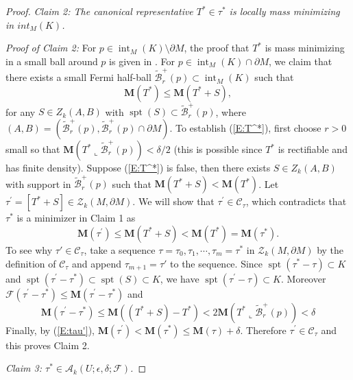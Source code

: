 \documentclass[10pt]{amsart}
\theoremstyle{definition}
\theoremstyle{remark}
\numberwithin{equation}{section}
\newcommand{\F}{\mathcal{F}}
\newcommand{\C}{\mathcal{C}}
\newcommand{\lc}{\llcorner}
\newcommand{\de}{\delta}
\newcommand{\ep}{\epsilon}
\newcommand{\pr}{\prime}
\newcommand{\Z}{\mathcal{Z}}
\newcommand{\M}{\mathbf{M}}
\newcommand{\sA}{\mathscr{A}}
\newcommand{\tBcal}{\widetilde{\mathcal{B}}}
\newcommand{\spt}{\operatorname{spt}}
\newcommand{\interior}{\operatorname{int}}
\begin{document}
\begin{proof}
\vspace{0.3cm}
\textit{Claim 2: The canonical representative $T^* \in \tau^*$ is locally mass minimizing in $int_M(K)$.}
\vspace{0.3cm}

\textit{Proof of Claim 2:} For $p \in \interior_M(K) \setminus \partial M$, the proof that $T^*$ is mass minimizing in a small ball around $p$ is given in \cite[3.10]{Pitts}. For $p \in \interior_M(K) \cap \partial M$, we claim that there exists a small Fermi half-ball $\tBcal^+_r(p) \subset \interior_M(K)$ such that
\begin{equation}
\label{E:T^*}
\M(T^*)\leq \M(T^*+S),
\end{equation}
for any $S\in Z_k(A, B)$ with $\spt(S)\subset \tBcal^+_r(p)$, where $(A,B)=(\tBcal^+_r(p),\tBcal^+_r(p) \cap \partial M)$. To establish (\ref{E:T^*}), first choose $r>0$ small so that $\M(T^* \lc \tBcal^+_r(p)) < \de/2$ (this is possible since $T^*$ is rectifiable and has finite density). Suppose (\ref{E:T^*}) is false, then there exists $S \in Z_k(A, B)$ with support in $\tBcal^+_r(p)$ such that $\M(T^*+S)<\M(T^*)$. Let $\tau^{\pr}=[T^*+S] \in\Z_k(M, \partial M)$. We will show that $\tau^{\pr}\in\C_{\tau}$, which contradicts that $\tau^*$ is a minimizer in Claim 1 as 
\begin{equation}
\label{E:tau'}
\M(\tau^{\pr})\leq\M(T^*+S)<\M(T^*)=\M(\tau^*). 
\end{equation}
To see why $\tau' \in \C_\tau$, take a sequence $\tau=\tau_0, \tau_1, \cdots, \tau_m=\tau^*$ in $\Z_k(M, \partial M)$ by the definition of $\C_{\tau}$ and append $\tau_{m+1}=\tau'$ to the sequence. Since $\spt(\tau^*-\tau) \subset K$ and $\spt(\tau^{\pr}-\tau^*) \subset \spt(S)\subset K$, we have $\spt(\tau^{\pr}-\tau)\subset K$. Moreover $\F(\tau^{\pr}-\tau^*) \leq \M(\tau^{\pr}-\tau^*)$ and 
\[ \M(\tau^{\pr}-\tau^*) \leq \M((T^*+S)-T^*) < 2 \M(T^* \lc \tBcal^+_r(p)) < \de\]
Finally, by (\ref{E:tau'}), $\M(\tau^{\pr})<\M(\tau^*)\leq \M(\tau)+\de$. Therefore $\tau^{\pr}\in\C_{\tau}$ and this proves Claim 2. 


\vspace{0.3cm}
\textit{Claim 3: $\tau^*\in \sA_k(U;\ep,\de;\F)$.}
\vspace{0.3cm}


\end{proof}
\end{document}
